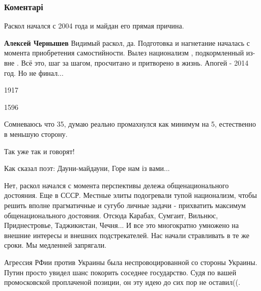  
 
 
 
 
\subsubsection{Коментарі}

\begin{itemize} %
Раскол начался с 2004 года и майдан его прямая причина.

\begin{itemize} %
\textbf{Алексей Чернышев} Видимый раскол, да. Подготовка и нагнетание началась с момента приобретения самостийности. Вылез национализм , подкормленный из-вне . Всё это, шаг за шагом, просчитано и притворено в жизнь. Апогей - 2014 год. Но не финал...
\end{itemize} %

1917

1596

Сомневаюсь что 35, думаю реально промахнулся как минимум на 5, естественно в меньшую сторону.

Так уже так и говорят!

Как сказал поэт:
Дауни-майдауни,
Горе нам із вами...


Нет, раскол начался с момента перспективы дележа общенационального достояния.
Еще в СССР. Местные элиты подогревали тупой национализм, чтобы решить вполне
прагматичные и сугубо личные задачи - прихватить максимум общенационального
достояния. Отсюда Карабах, Сумгаит, Вильнюс, Приднестровье, Таджикистан,
Чечня... И все это многократно умножено на внешние интересы и внешних
подстрекателей. Нас начали стравливать в те же сроки. Мы медленней запрягали.



Агрессия РФии против Украины была неспровоцированной со стороны Украины. Путин
просто увидел шанс покорить соседнее государство. Судя по вашей промосковской
проплаченой позиции, он эту идею до сих пор не оставил((.


\end{itemize}
